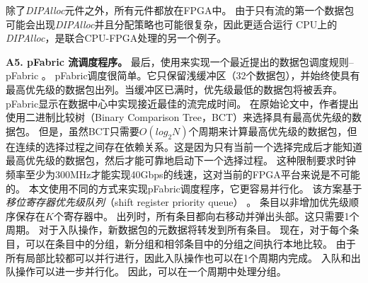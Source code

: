 除了\textit {DIPAlloc}元件之外，所有元件都放在FPGA中。
由于只有流的第一个数据包可能会出现\textit {DIPAlloc}并且分配策略也可能很复杂，因此更适合运行
CPU上的\textit {DIPAlloc}，是联合CPU-FPGA处理的另一个例子。

%



\textbf {A5. pFabric 流调度程序。}
最后，使用\name 来实现一个最近提出的数据包调度规则--pFabric \cite {pfabric}。
pFabric调度很简单。它只保留浅缓冲区（32个数据包），并始终使具有最高优先级的数据包出列。当缓冲区已满时，优先级最低的数据包将被丢弃。
pFabric显示在数据中心中实现接近最佳的流完成时间。
在原始论文中，作者提出使用二进制比较树（Binary Comparison Tree，BCT）来选择具有最高优先级的数据包。
但是，虽然BCT只需要$O(log_2 N)$个周期来计算最高优先级的数据包，但在连续的选择过程之间存在依赖关系。这是因为只有当前一个选择完成后才能知道最高优先级的数据包，然后才能可靠地启动下一个选择过程。
这种限制要求时钟频率至少为300MHz才能实现40Gbps的线速，这对当前的FPGA平台来说是不可能的。
本文使用不同的方式来实现pFabric调度程序，它更容易并行化。
该方案基于\textit{移位寄存器优先级队列}（shift register priority queue） \cite {moon2000scalable}。
条目以非增加优先级顺序保存在$K$个寄存器中。
出列时，所有条目都向右移动并弹出头部。这只需要1个周期。
对于入队操作，新数据包的元数据将转发到所有条目。
现在，对于每个条目，可以在条目中的分组，新分组和相邻条目中的分组之间执行本地比较。
由于所有局部比较都可以并行进行，因此入队操作也可以在1个周期内完成。
入队和出队操作可以进一步并行化。
因此，可以在一个周期中处理分组。

